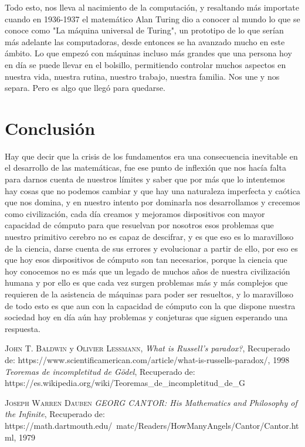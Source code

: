 \documentclass{article}
\begin{document}
\newpage
Todo esto, nos lleva al nacimiento de la computación, y resaltando más importate cuando en 1936-1937 el matemático Alan Turing dio a conocer al mundo lo que se conoce como "La máquina universal de Turing", un prototipo de lo que serían más adelante las computadoras, desde entonces se ha avanzado mucho en este ámbito.
\newline
Lo que empezó con máquinas incluso más grandes que una persona hoy en día se puede llevar en el bolsillo, permitiendo controlar muchos aspectos en nuestra vida, nuestra rutina, nuestro trabajo, nuestra familia. Nos une y nos separa. Pero es algo que llegó para quedarse. 







\newpage

\section{Conclusión}
Hay que decir que la crisis de los fundamentos era una consecuencia inevitable en el desarrollo de las matemáticas, fue ese punto de inflexión que nos hacía falta para darnos cuenta de nuestros límites y saber que por más que lo intentemos hay cosas que no podemos cambiar y que hay una naturaleza imperfecta y caótica que nos domina, y en nuestro intento por dominarla nos desarrollamos y crecemos como civilización, cada día creamos y mejoramos dispositivos con mayor capacidad de cómputo para que resuelvan por nosotros esos problemas que nuestro primitivo cerebro no es capaz de descifrar, y es que eso es lo maravilloso de la ciencia, darse cuenta de sus errores y evolucionar a partir de ello, por eso es que hoy esos dispositivos de cómputo son tan necesarios, porque la ciencia que hoy conocemos no es más que un legado de muchos años de nuestra civilización humana y por ello es que cada vez surgen problemas más y más complejos que requieren de la asistencia de máquinas para poder ser resueltos, y lo maravilloso de todo esto es que aun con la capacidad de cómputo con la que dispone nuestra sociedad hoy en día aún hay problemas y conjeturas que siguen esperando una respuesta.


\newpage

\begin{thebibliography}{X}
 \textsc{John T. Baldwin} y \textsc{Olivier Lessmann},
\textit{What is Russell's paradox?}, Recuperado de: https://www.scientificamerican.com/article/what-is-russells-paradox/,
1998
\textit{Teoremas de incompletitud de Gödel}, Recuperado de: https://es.wikipedia.org/wiki/Teoremas_de_incompletitud_de_G%

 \textsc{Joseph Warren Dauben} 
\textit{GEORG CANTOR: His Mathematics and Philosophy of the Infinite}, Recuperado de: https://math.dartmouth.edu/~matc/Readers/HowManyAngels/Cantor/Cantor.html, 1979

\end{thebibliography}
\end{document}
